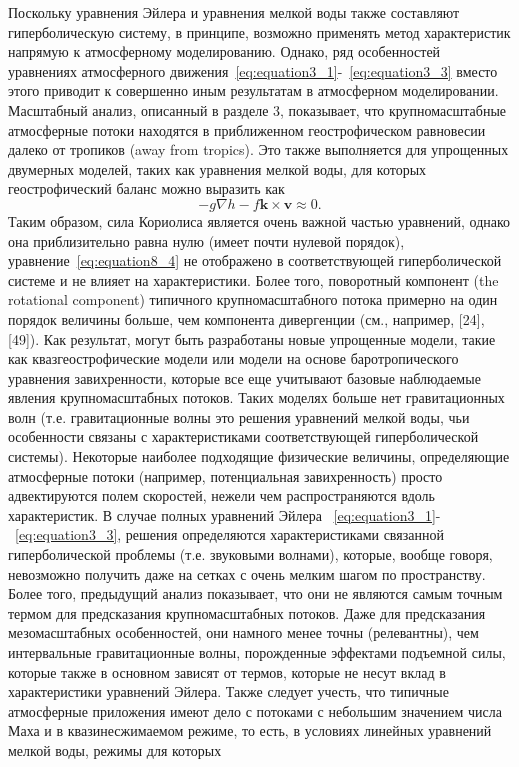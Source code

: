 Поскольку уравнения Эйлера и уравнения мелкой воды также составляют гиперболическую систему, в принципе, возможно применять метод характеристик напрямую к атмосферному моделированию. Однако, ряд особенностей уравнениях атмосферного движения~\eqref{eq:equation3_1}-~\eqref{eq:equation3_3} вместо этого приводит к совершенно иным результатам в атмосферном моделировании. Масштабный анализ, описанный в разделе 3, показывает, что крупномасштабные атмосферные потоки находятся в приближенном геострофическом равновесии далеко от тропиков (away from tropics). Это также выполняется для упрощенных двумерных моделей, таких как уравнения мелкой воды, для которых геострофический баланс можно выразить как 
%
\begin{equation}
\label{eq:equation8_4}
-g\nabla h - f\mathbf{k}\times\mathbf{v}\approx 0.
\end{equation}
%
Таким образом, сила Кориолиса является очень важной частью уравнений, однако она приблизительно равна нулю (имеет почти нулевой порядок), уравнение~\eqref{eq:equation8_4} не отображено в соответствующей гиперболической системе и не влияет на характеристики. Более того, поворотный компонент (the rotational component) типичного крупномасштабного потока примерно на один порядок величины больше, чем компонента дивергенции (см., например, [24], [49]). Как результат, могут быть разработаны новые упрощенные модели, такие как квазгеострофические модели или модели на основе баротропического уравнения завихренности, которые все еще учитывают базовые наблюдаемые явления крупномасштабных потоков. Таких моделях больше нет гравитационных волн (т.е. гравитационные волны это решения уравнений мелкой воды, чьи особенности связаны с характеристиками соответствующей гиперболической системы). Некоторые наиболее подходящие физические величины, определяющие атмосферные потоки (например, потенциальная завихренность) просто адвектируются полем скоростей, нежели чем распространяются вдоль характеристик. В случае полных уравнений Эйлера ~\eqref{eq:equation3_1}-~\eqref{eq:equation3_3}, решения определяются характеристиками связанной гиперболической проблемы (т.е. звуковыми волнами), которые, вообще говоря, невозможно получить даже на сетках с очень мелким шагом по пространству. Более того, предыдущий анализ показывает, что они не являются самым точным термом для предсказания крупномасштабных потоков. Даже для предсказания мезомасштабных особенностей, они намного менее точны (релевантны), чем интервальные гравитационные волны, порожденные эффектами подъемной силы, которые также в основном зависят от термов, которые не несут вклад в характеристики уравнений Эйлера. Также следует учесть, что типичные атмосферные приложения имеют дело с потоками с небольшим значением числа Маха и в квазинесжимаемом режиме, то есть, в условиях линейных уравнений мелкой воды, режимы для которых
